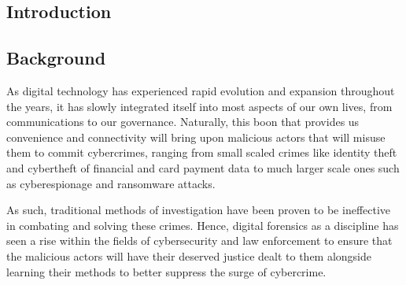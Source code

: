 \documentclass[12pt,a4paper]{article}
\begin{document}
\begin{justify}


\section{Introduction}

\subsection{Background}

As digital technology has experienced rapid evolution and expansion throughout the years, it has slowly integrated itself into most aspects of our own lives, from communications to our governance. Naturally, this boon that provides us convenience and connectivity will bring upon malicious actors that will misuse them to commit cybercrimes, ranging from small scaled crimes like identity theft and cybertheft of financial and card payment data to much larger scale ones such as cyberespionage and ransomware attacks.

As such, traditional methods of investigation have been proven to be ineffective in combating and solving these crimes. Hence, digital forensics as a discipline has seen a rise within the fields of cybersecurity and law enforcement to ensure that the malicious actors will have their deserved justice dealt to them alongside learning their methods to better suppress the surge of cybercrime.








\end{justify}
\end{document}
